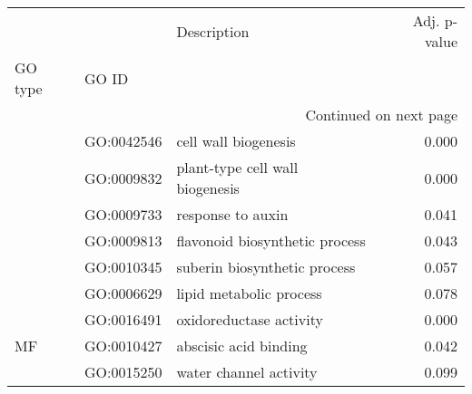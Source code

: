 \begin{longtable}{lllr}
\toprule
   &            &                      Description &  Adj. p-value \\
GO type & GO ID &                                  &               \\
\midrule
\endhead
\midrule
\multicolumn{4}{r}{{Continued on next page}} \\
\midrule
\endfoot

\bottomrule
\endlastfoot
\multirow{6}{*}{BP} & GO:0042546 &             cell wall biogenesis &         0.000 \\
   & GO:0009832 &  plant-type cell wall biogenesis &         0.000 \\
   & GO:0009733 &                response to auxin &         0.041 \\
   & GO:0009813 &   flavonoid biosynthetic process &         0.043 \\
   & GO:0010345 &     suberin biosynthetic process &         0.057 \\
   & GO:0006629 &          lipid metabolic process &         0.078 \\
\cline{1-4}
\multirow{3}{*}{MF} & GO:0016491 &          oxidoreductase activity &         0.000 \\
   & GO:0010427 &            abscisic acid binding &         0.042 \\
   & GO:0015250 &           water channel activity &         0.099 \\
\end{longtable}
